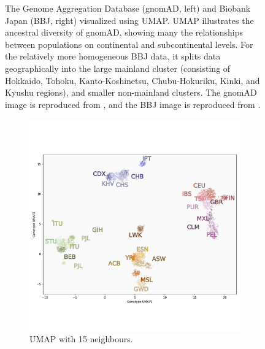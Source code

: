 \documentclass[12pt]{article}
\begin{document}
\begin{figure}[h!]
  \caption{The Genome Aggregation Database (gnomAD, left) and Biobank Japan (BBJ, right) visualized using UMAP. UMAP illustrates the ancestral diversity of gnomAD, showing many the relationships between populations on continental and subcontinental levels. For the relatively more homogeneous BBJ data, it splits data geographically into the large mainland cluster (consisting of Hokkaido, Tohoku, Kanto-Koshinetsu, Chubu-Hokuriku, Kinki, and Kyushu regions), and smaller non-mainland clusters. The gnomAD image is reproduced from \cite{karczewski_mutational_2020}, and the BBJ image is reproduced from \cite{sakaue_dimensionality_2020}.
  }
  \label{fig:external_UMAP}
\end{figure}

\clearpage

\begin{figure}[h!]
  \centering
  \begin{subfigure}[b]{0.48\linewidth}
    \includegraphics[width=\linewidth]{code/images/1KGP_genotype_UMAP_low_NN.png}
    \caption{UMAP with 15 neighbours.}
    \label{fig:UMAP_low_NN_1KGP}
  \end{subfigure}
  \begin{subfigure}[b]{0.48\linewidth}

\end{subfigure}
\end{figure}
\end{document}
